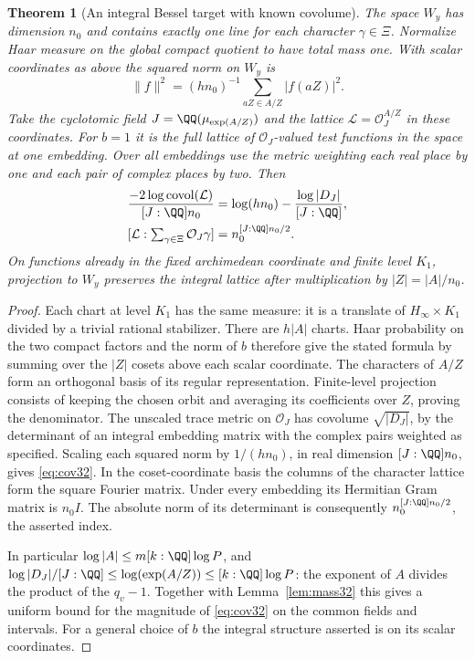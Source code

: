 \documentclass[a4paper,11pt]{article}
\newtheorem{theorem}[proposition]{Theorem}
\theoremstyle{definition}
\theoremstyle{remark}
\numberwithin{equation}{section}
\newcommand{\OO}{\mathcal O}
\begin{document}
\begin{theorem}[An integral Bessel target with known covolume]\leavevmode\label{thm:lattice32}
The space \(W_y\) has dimension \(n_0\) and contains exactly one line for each character \(\gamma\in\Xi\). Normalize Haar measure on the global compact quotient to have total mass one. With scalar coordinates as above the squared norm on \(W_y\) is
\[
           \|f\|^2=(h n_0)^{-1}\sum_{aZ\in A/Z}|f(aZ)|^2.
\]
Take the cyclotomic field \(J=\QQ(\mu_{\exp(A/Z)})\) and the lattice \(\mathcal L=\OO_J^{A/Z}\) in these coordinates. For \(b=1\) it is the full lattice of \(\OO_J\)-valued test functions in the space at one embedding. Over all embeddings use the metric weighting each real place by one and each pair of complex places by two. Then
\begin{align}
 \frac{-2\log\operatorname{covol}(\mathcal L)}{[J:\QQ]n_0}
       &=\log(hn_0)-\frac{\log|D_J|}{[J:\QQ]},                 \label{eq:cov32}\\
 [\mathcal L:\textstyle\sum_{\gamma\in\Xi}\OO_J\gamma]
       &=n_0^{[J:\QQ]n_0/2}.                                  \label{eq:index32}
\end{align}
On functions already in the fixed archimedean coordinate and finite level \(K_1\), projection to \(W_y\) preserves the integral lattice after multiplication by \(|Z|=|A|/n_0\).
\end{theorem}
\begin{proof}
Each chart at level \(K_1\) has the same measure: it is a translate of \(H_\infty\times K_1\) divided by a trivial rational stabilizer. There are \(h|A|\) charts. Haar probability on the two compact factors and the norm of \(b\) therefore give the stated formula by summing over the \(|Z|\) cosets above each scalar coordinate. The characters of \(A/Z\) form an orthogonal basis of its regular representation. Finite-level projection consists of keeping the chosen orbit and averaging its coefficients over \(Z\), proving the denominator. The unscaled trace metric on \(\OO_J\) has covolume \(\sqrt{|D_J|}\), by the determinant of an integral embedding matrix with the complex pairs weighted as specified. Scaling each squared norm by \(1/(h n_0)\), in real dimension \([J:\QQ]n_0\), gives \eqref{eq:cov32}. In the coset-coordinate basis the columns of the character lattice form the square Fourier matrix. Under every embedding its Hermitian Gram matrix is \(n_0 I\). The absolute norm of its determinant is consequently \(n_0^{[J:\QQ]n_0/2}\), the asserted index.

In particular \(\log |A|\le m[k:\QQ]\log P\), and \(\log|D_J|/[J:\QQ]\le\log(\exp(A/Z))\le [k:\QQ]\log P\): the exponent of \(A\) divides the product of the \(q_v-1\). Together with Lemma~\ref{lem:mass32} this gives a uniform bound for the magnitude of \eqref{eq:cov32} on the common fields and intervals. For a general choice of \(b\) the integral structure asserted is on its scalar coordinates.
\end{proof}
\end{document}
